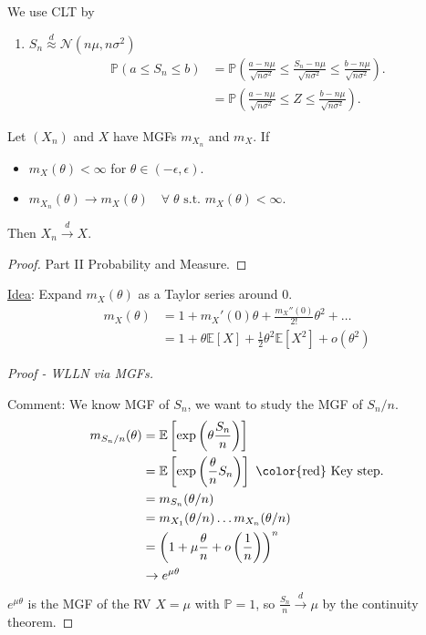 We use CLT by 
\begin{enumerate}
    \item $S_n \overset{d}{\approx} \mathcal{N}(n \mu, n \sigma^2)$
    \mathitem 
    \begin{align*}
        \mathbb{P}(a \leq S_n \leq b) &= \mathbb{P}\left( \frac{a - n \mu}{\sqrt{n \sigma^2}} \leq \frac{S_n - n \mu}{\sqrt{n \sigma^2}} \leq \frac{b - n \mu}{\sqrt{n \sigma^2}} \right). \\
        &= \mathbb{P} \left( \frac{a - n \mu}{\sqrt{n \sigma^2}} \leq Z \leq \frac{b - n \mu}{\sqrt{n \sigma^2}} \right).
    \end{align*} 
\end{enumerate} 

\begin{theorem}
    Let $(X_n)$ and $X$ have MGFs $m_{X_n}$ and $m_X$.
    If \begin{itemize}
        \item $m_X(\theta) < \infty$ for $\theta \in (-\epsilon, \epsilon)$.
        \item $m_{X_n}(\theta) \to m_X(\theta) \quad \forall \; \theta \text{ s.t. } m_X(\theta) < \infty$.
    \end{itemize} 
    Then $X_n \overset{d}{\to} X$.
\end{theorem} 

\begin{proof}
    Part II Probability and Measure.
\end{proof} 

\underline{Idea}: Expand $m_X(\theta)$ as a Taylor series around $0$.
\begin{align*}
    m_X(\theta) &= 1 + m_X'(0) \theta + \frac{m_X''(0)}{2!} \theta^2 + \dots \\
    &= 1 + \theta \mathbb{E}[X] + \frac{1}{2} \theta^2 \mathbb{E}[X^2] + o(\theta^2)
\end{align*} 

\begin{proof}[Proof - WLLN via MGFs] ~

    Comment: We know MGF of $S_n$, we want to study the MGF of $S_n / n$.
    \begin{align*}
        m_{S_n / n}(\theta) &= \mathbb{E}\left[\exp \left( \theta \frac{S_n}{n} \right) \right] \\
        &= \mathbb{E}\left[\exp \left( \frac{\theta}{n} S_n \right) \right] \ \text{\color{red} Key step}. \\
        &= m_{S_n}(\theta / n) \\
        &= m_{X_1}(\theta / n) \dots m_{X_n}(\theta / n) \\
        &= \left( 1 + \mu \frac{\theta}{n} + o \left( \frac{1}{n} \right) \right)^n \\
        &\to e^{\mu \theta}
    \end{align*} 
    $e^{\mu \theta}$ is the MGF of the RV $X = \mu$ with $\mathbb{P} = 1$, so $\frac{S_n}{n} \overset{d}{\to} \mu$ by the continuity theorem.
\end{proof} 

